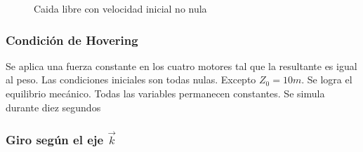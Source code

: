 \documentclass[main]{subfiles}
\begin{document}
\begin{figure} 
  \centering
 
  \caption{Caida libre con velocidad inicial no nula}
  \label{fig:caida_libre_vi}
\end{figure}


\subsubsection{Condici\'on de Hovering}

Se aplica una fuerza constante en los cuatro motores tal que la resultante es igual al peso. Las condiciones iniciales son todas nulas. Excepto $Z_0=10m$. Se logra el equilibrio mec\'anico. Todas las variables permanecen constantes. Se simula durante diez segundos

\subsubsection{Giro seg\'un el eje $\vec{k}$}
\end{document}
